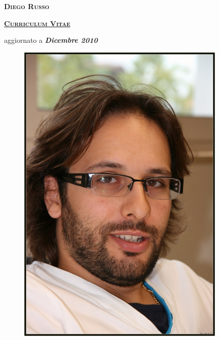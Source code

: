 \documentclass[totpages,helvetica,openbib,italian]{europecv}
\begin{document}
    \begin{center}
        \hspace{1pt}
        \vspace{2cm}
    
        {\scshape \textbf{\Huge Diego Russo}}
    
        \vspace{1cm}
    
        {\scshape \textbf{\large \underline{Curriculum Vitae}}}
    
        \vspace{0.25cm}
    
        aggiornato a \emph{\textbf{Dicembre 2010}}
        
        \vspace{2cm}
        
        \begin{figure}[htbp] 
            \begin{center} 
                \includegraphics[width=10cm]{io.jpg}
            \end{center} 
        \end{figure}
        
    \end{center}
\pagebreak
{}
\end{document}
